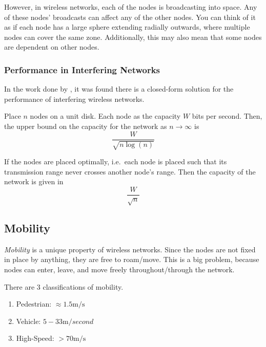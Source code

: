However, in wireless networks, each of the nodes is broadcasting into space.
Any of these nodes' broadcasts can affect any of the other nodes.
You can think of it as if each node has a large sphere extending radially outwards, where multiple nodes can cover the same zone.
Additionally, this may also mean that some nodes are dependent on other nodes.

\subsubsection{Performance in Interfering Networks}\label{subsubsec:Performance_Interfering_Networks}
In the work done by \citeauthor{Wireless_Network_Capacity}, it was found there is a closed-form solution for the performance of interfering wireless networks.

Place $n$ nodes on a unit disk.
Each node as the capacity $W$ bits per second.
Then, the upper bound on the capacity for the network as $n \rightarrow \infty$ is
\begin{equation}\label{eq:Wireless_Network_Capacity_Upper_Bound}
  \frac{W}{\sqrt{n \log(n)}}
\end{equation}

If the nodes are placed optimally, i.e.\ each node is placed such that its transmission range never crosses another node's range.
Then the capacity of the network is given in 
\begin{equation}\label{eq:Wireless_Network_Capacity_Optimal}
  \frac{W}{\sqrt{n}}
\end{equation}

\subsection{Mobility}\label{subsec:Wireless_Mobility}
\begin{definition}[Mobility]\label{def:Mobility}
  \emph{Mobility} is a unique property of wireless networks.
  Since the nodes are not fixed in place by anything, they are free to roam/move.
  This is a big problem, because nodes can enter, leave, and move freely throughout/through the network.
\end{definition}

There are 3 classifications of mobility.
\begin{enumerate}[noitemsep]
\item Pedestrian: $\approx 1.5 \si{\meter/\second}$
\item Vehicle: $5-33 \si{\meter/second}$
\item High-Speed: $> 70 \si{\meter/\second}$
\end{enumerate}


